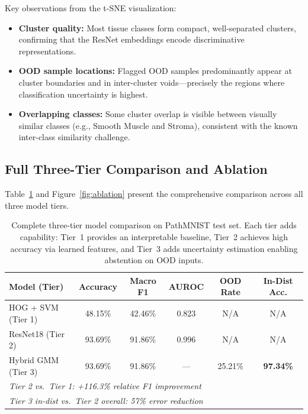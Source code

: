 \documentclass{article}
\begin{document}
Key observations from the t-SNE visualization:
\begin{itemize}
    \item \textbf{Cluster quality:} Most tissue classes form compact, well-separated clusters, confirming that the ResNet embeddings encode discriminative representations.
    \item \textbf{OOD sample locations:} Flagged OOD samples predominantly appear at cluster boundaries and in inter-cluster voids---precisely the regions where classification uncertainty is highest.
    \item \textbf{Overlapping classes:} Some cluster overlap is visible between visually similar classes (e.g., Smooth Muscle and Stroma), consistent with the known inter-class similarity challenge.
\end{itemize}

\subsection{Full Three-Tier Comparison and Ablation}

Table~\ref{tab:full_comparison} and Figure~\ref{fig:ablation} present the comprehensive comparison across all three model tiers.

\begin{table}[h]
\centering
\caption{Complete three-tier model comparison on PathMNIST test set. Each tier adds capability: Tier~1 provides an interpretable baseline, Tier~2 achieves high accuracy via learned features, and Tier~3 adds uncertainty estimation enabling abstention on OOD inputs.}
\label{tab:full_comparison}
\begin{tabular}{lccccc}
\toprule
\textbf{Model (Tier)} & \textbf{Accuracy} & \textbf{Macro F1} & \textbf{AUROC} & \textbf{OOD Rate} & \textbf{In-Dist Acc.} \\
\midrule
HOG + SVM (Tier 1) & 48.15\% & 42.46\% & 0.823 & N/A & N/A \\
ResNet18 (Tier 2) & 93.69\% & 91.86\% & 0.996 & N/A & N/A \\
Hybrid GMM (Tier 3) & 93.69\% & 91.86\% & --- & 25.21\% & \textbf{97.34\%} \\
\midrule
\multicolumn{6}{l}{\textit{Tier 2 vs.\ Tier 1: +116.3\% relative F1 improvement}} \\
\multicolumn{6}{l}{\textit{Tier 3 in-dist vs.\ Tier 2 overall: 57\% error reduction}} \\
\bottomrule
\end{tabular}
\end{table}
\end{document}

